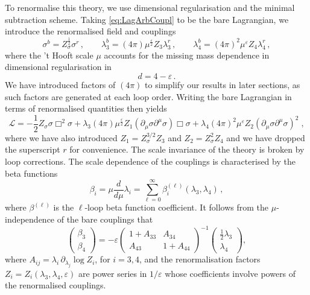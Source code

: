 \documentclass[a4paper,11pt]{article}
\begin{document}
To renormalise this theory, we use dimensional regularisation and the minimal subtraction scheme. Taking \eqref{eq:LagArbCoupl} to be the bare Lagrangian, we introduce the renormalised field and couplings 
\begin{equation}\label{eq:FieldBare}
    \sigma^{b} = Z_\sigma^{\frac{1}{2}} \sigma^{r} \,,
    \qquad
    \lambda_{3}^{b} =(4\pi)\mu^{\frac{\varepsilon}{2}}Z_{3}  \lambda_{3}^{r} \,,
    \qquad
    \lambda_{4}^{b} = (4\pi)^2 \mu^{\varepsilon} Z_{4} \lambda_{4}^{r} \,,
\end{equation}
where the 't Hooft scale $\mu$ accounts for the missing mass dependence in dimensional regularisation in 
\begin{equation*}
    d = 4 - \varepsilon \,.
\end{equation*}
We have introduced factors of $(4\pi)$ to simplify our results in later sections, as such factors are generated at each loop order. Writing the bare Lagrangian in terms of renormalised quantities then yields
\begin{equation}\label{eq:RenromalisedInteractingLagrangian}
    \mathcal{L} = -\frac{1}{2} Z_\sigma \sigma \Box^2 \sigma +  \lambda_3 (4\pi)\mu^{\frac{\varepsilon}{2}} Z_1   (\partial_\mu \sigma   \partial^\mu \sigma) \Box \sigma +   \lambda_4 (4\pi)^2 \mu^{\varepsilon}Z_2 (\partial_\mu \sigma  \partial^\mu \sigma)^2 \;,
\end{equation}
where we have also introduced $Z_1 = Z_\sigma^{3/2}Z_{3}$ and $ Z_2 =Z_\sigma^2 Z_{4}$ and we have dropped the superscript $r$ for convenience. The scale invariance of the theory is broken by loop corrections. The scale dependence of the couplings is characterised by the beta functions
\begin{equation}
     \beta_i = \mu \frac{d}{d\mu} \lambda_i =  \sum_{\ell = 0}^{\infty}\beta_i^{(\ell)}(\lambda_3,\lambda_4) \,,
\end{equation}
where $\beta^{(\ell)}$ is the $\ell$-loop beta function coefficient. It follows from the $\mu$-independence of the bare couplings that
\begin{equation}\label{eq:fullbetai}
    \begin{pmatrix}
        \beta_3 \\ \beta_4
    \end{pmatrix}
    = -\varepsilon
    \begin{pmatrix}
        1+A_{33} & A_{34}\\ A_{43} & 1+A_{44}
    \end{pmatrix}^{-1}
    \begin{pmatrix}
        \frac{1}{2}\lambda_3 \\ \lambda_4
    \end{pmatrix},
\end{equation}
where $A_{ij}=\lambda_i\,\partial_{\lambda_j}\log Z_i$, for $i=3,4$, and the renormalisation factors $Z_i = Z_i(\lambda_3,\lambda_4,\varepsilon)$ are power series in $1/\varepsilon$ whose coefficients involve powers of the renormalised couplings. 
\end{document}
